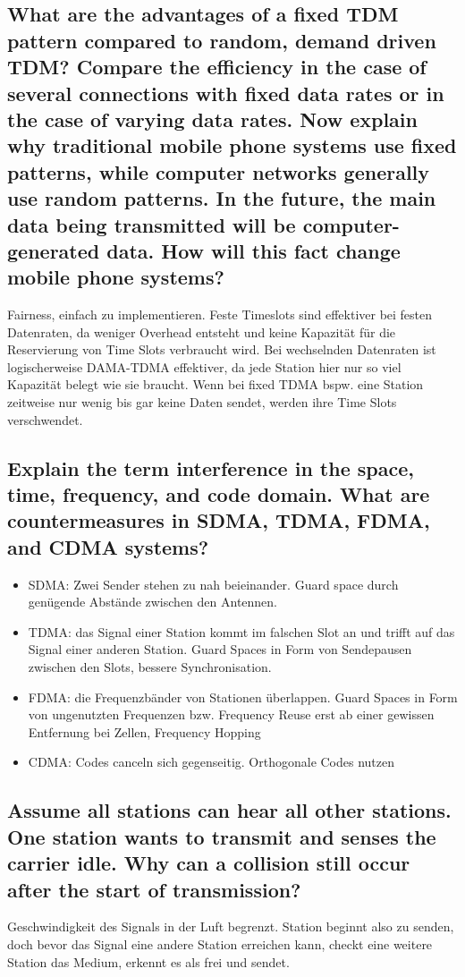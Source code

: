 \subsection{What are the advantages of a fixed TDM pattern compared to random, demand
driven TDM? Compare the efficiency in the case of several connections with fixed
data rates or in the case of varying data rates. Now explain why traditional mobile
phone systems use fixed patterns, while computer networks generally use random
patterns. In the future, the main data being transmitted will be computer-generated
data. How will this fact change mobile phone systems?}
Fairness, einfach zu implementieren. Feste Timeslots sind effektiver bei festen Datenraten, da weniger Overhead entsteht und keine Kapazität für die Reservierung von Time Slots verbraucht wird. Bei wechselnden Datenraten ist logischerweise DAMA-TDMA effektiver, da jede Station hier nur so viel Kapazität belegt wie sie braucht. Wenn bei fixed TDMA bspw. eine Station zeitweise nur wenig bis gar keine Daten sendet, werden ihre Time Slots verschwendet.


\subsection{Explain the term interference in the space, time, frequency, and code domain. What
are countermeasures in SDMA, TDMA, FDMA, and CDMA systems?}
\begin{itemize}

\item SDMA: Zwei Sender stehen zu nah beieinander. Guard space durch genügende Abstände zwischen den Antennen. 

\item TDMA: das Signal einer Station kommt im falschen Slot an und trifft auf das Signal einer anderen Station. Guard Spaces in Form von Sendepausen zwischen den Slots, bessere Synchronisation.

\item FDMA: die Frequenzbänder von Stationen überlappen. Guard Spaces in Form von ungenutzten Frequenzen bzw. Frequency Reuse erst ab einer gewissen Entfernung bei Zellen, Frequency Hopping

\item CDMA: Codes canceln sich gegenseitig. Orthogonale Codes nutzen

\end{itemize}

\subsection{Assume all stations can hear all other stations. One station wants to transmit and
senses the carrier idle. Why can a collision still occur after the start of transmission?}
Geschwindigkeit des Signals in der Luft begrenzt. Station beginnt also zu senden, doch bevor das Signal eine andere Station erreichen kann, checkt eine weitere Station das Medium, erkennt es als frei und sendet.

